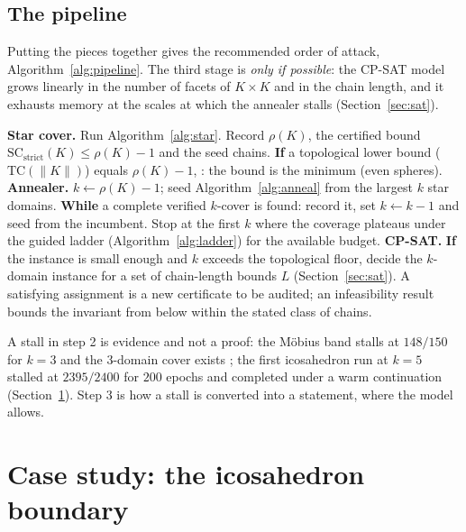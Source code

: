 \documentclass[12pt]{article}
\newcommand{\TC}{\mathrm{TC}}
\newcommand{\SC}{\mathrm{SC}}
\newcommand{\SCst}{\SC_{\mathrm{strict}}}
\begin{document}
\subsection{The pipeline}

Putting the pieces together gives the recommended order of attack,
Algorithm~\ref{alg:pipeline}.  The third stage is \emph{only if
possible}: the CP-SAT model grows linearly in the number of facets of
$K\times K$ and in the chain length, and it exhausts memory at the scales
at which the annealer stalls (Section~\ref{sec:sat}).

\begin{algorithm}[H]
\caption{\textsc{Pipeline}($K$): the recommended order of attack on the
minimum cover of $K\times K$.}
\label{alg:pipeline}
\begin{algorithmic}[1]
\State \textbf{Star cover.}  Run Algorithm~\ref{alg:star}.  Record
$\rho(K)$, the certified bound $\SCst(K)\le\rho(K)-1$ and the seed
chains.  \textbf{If} a topological lower bound ($\TC(\|K\|)$) equals
$\rho(K)-1$, \Return: the bound is the minimum (even spheres).
\State \textbf{Annealer.}  $k\gets\rho(K)-1$; seed Algorithm~\ref{alg:anneal}
from the largest $k$ star domains.  \textbf{While} a complete verified
$k$-cover is found: record it, set $k\gets k-1$ and seed from the
incumbent.  Stop at the first $k$ where the coverage plateaus under the
guided ladder (Algorithm~\ref{alg:ladder}) for the available budget.
\State \textbf{CP-SAT.}  \textbf{If} the instance is small enough and
$k$ exceeds the topological floor, decide the $k$-domain instance for a
set of chain-length bounds $L$ (Section~\ref{sec:sat}).  A satisfying
assignment is a new certificate to be audited; an infeasibility result
bounds the invariant from below within the stated class of chains.
\end{algorithmic}
\end{algorithm}

A stall in step 2 is evidence and not a proof: the M\"obius band stalls at
$148/150$ for $k=3$ and the $3$-domain cover exists \cite{PM26}; the first
icosahedron run at $k=5$ stalled at $2395/2400$ for $200$ epochs and
completed under a warm continuation (Section~\ref{sec:icosa}).  Step 3 is
how a stall is converted into a statement, where the model allows.

\section{Case study: the icosahedron boundary}\label{sec:icosa}
\end{document}
